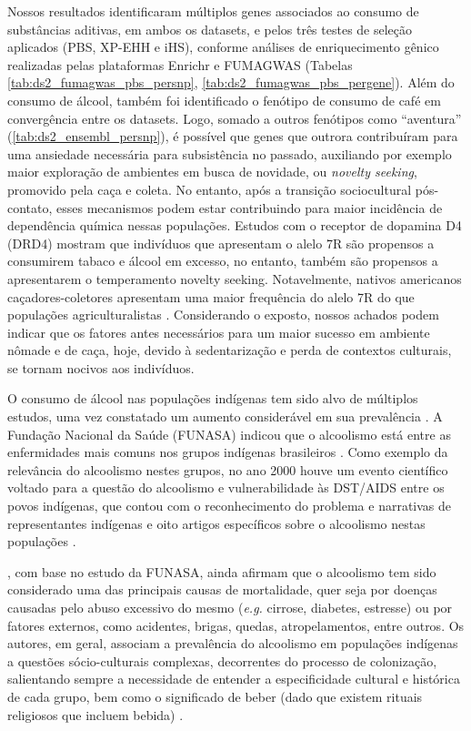 Nossos resultados identificaram múltiplos genes associados ao consumo de substâncias aditivas, em ambos os datasets, e pelos três testes de seleção aplicados (PBS, XP-EHH e iHS), conforme análises de enriquecimento gênico realizadas pelas plataformas Enrichr e FUMAGWAS (Tabelas \ref{tab:ds2_fumagwas_pbs_persnp}, \ref{tab:ds2_fumagwas_pbs_pergene}). Além do consumo de álcool, também foi identificado o fenótipo de consumo de café em convergência entre os datasets. Logo, somado a outros fenótipos como “aventura” (\autoref{tab:ds2_ensembl_persnp}), é possível que genes que outrora contribuíram para uma ansiedade necessária para subsistência no passado, auxiliando por exemplo maior exploração de ambientes em busca de novidade, ou \textit{novelty seeking}, promovido pela caça e coleta. No entanto, após a transição sociocultural pós-contato, esses mecanismos podem estar contribuindo para maior incidência de dependência química nessas populações. Estudos com o receptor de dopamina D4 (DRD4) mostram que indivíduos que apresentam o alelo 7R são propensos a consumirem tabaco e álcool em excesso, no entanto, também são propensos a apresentarem o temperamento novelty seeking. Notavelmente, nativos americanos caçadores-coletores apresentam uma maior frequência do alelo 7R do que populações agriculturalistas \cite{tovo-rodrigues_dopamine_2010}. Considerando o exposto, nossos achados podem indicar que os fatores antes necessários para um maior sucesso em ambiente nômade e de caça, hoje, devido à sedentarização e perda de contextos culturais, se tornam nocivos aos indivíduos.

O consumo de álcool nas populações indígenas tem sido alvo de múltiplos estudos, uma vez constatado um aumento considerável em sua prevalência \cite{coimbra_jr_epidemiologia_2003}. A Fundação Nacional da Saúde (FUNASA) indicou que o alcoolismo está entre as enfermidades mais comuns nos grupos indígenas brasileiros \cite{funasa_politica_2002}. Como exemplo da relevância do alcoolismo nestes grupos, no ano 2000 houve um evento científico voltado para a questão do alcoolismo e vulnerabilidade às DST/AIDS entre os povos indígenas, que contou com o reconhecimento do problema e narrativas de representantes indígenas e oito artigos específicos sobre o alcoolismo nestas populações \cite{ministerio_da_saude_anais_2001}.

, com base no estudo da FUNASA, ainda afirmam que o alcoolismo tem sido considerado uma das principais causas de mortalidade, quer seja por doenças causadas pelo abuso excessivo do mesmo (\emph{e.g.} cirrose, diabetes, estresse) ou por fatores externos, como acidentes, brigas, quedas, atropelamentos, entre outros. Os autores, em geral, associam a prevalência do alcoolismo em populações indígenas a questões sócio-culturais complexas, decorrentes do processo de colonização, salientando sempre a necessidade de entender a especificidade cultural e histórica de cada grupo, bem como o significado de beber (dado que existem rituais religiosos que incluem bebida) \cite{ministerio_da_saude_anais_2001,langdon_o_2005}.

